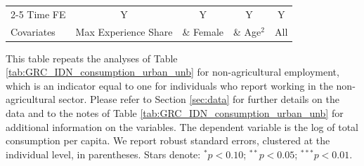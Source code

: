 \begin{table}[htbp]
\begin{threeparttable}
\begin{tabular}{l cccc}
\cmidrule{2-5} Time FE & Y & Y & Y & Y \\ Covariates & Max Experience Share & \& Female & \& Age$^2$ & All \\ \bottomrule \end{tabular} \begin{tablenotes}[flushleft] \footnotesize \item{This table repeats the analyses of Table \ref{tab:GRC_IDN_consumption_urban_unb}  for non-agricultural employment, which is an indicator equal to one for individuals who report working in the non-agricultural sector. Please refer to Section \ref{sec:data} for further details on the data and to the notes of Table \ref{tab:GRC_IDN_consumption_urban_unb} for additional information on the variables. The dependent variable is the log of total consumption per capita. We report robust standard errors, clustered at the individual level, in parentheses. Stars denote: $^{*} p<0.10$; $^{**} p<0.05$; $^{***} p<0.01$.} \end{tablenotes} \end{threeparttable} \end{table}
